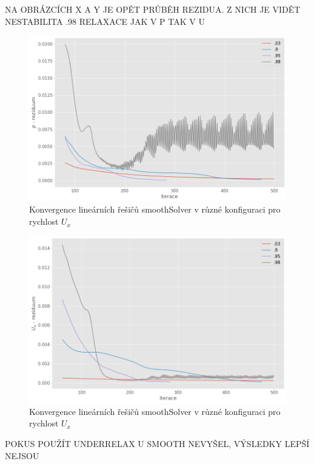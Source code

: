 \documentclass[a4paper,12pt]{report}
\theoremstyle{remark}
\begin{document}
NA OBRÁZCÍCH X A Y JE OPĚT PRŮBĚH REZIDUA. Z NICH JE VIDĚT NESTABILITA .98 RELAXACE JAK V P TAK V U

\begin{figure}[H]
	\centering
	\includegraphics[width=1\linewidth]{p-under-relax.png}
	\caption{Konvergence lineárních řešičů smoothSolver v různé konfiguraci pro rychlost $U_x$}
	\label{fig:p-residuum-relax}
\end{figure}

\begin{figure}[H]
	\centering
	\includegraphics[width=1\linewidth]{ux-under-relax.png}
	\caption{Konvergence lineárních řešičů smoothSolver v různé konfiguraci pro rychlost $U_x$}
	\label{fig:ux-residuum-relax}
\end{figure}

POKUS POUŽÍT UNDERRELAX U SMOOTH NEVYŠEL, VÝSLEDKY LEPŠÍ NEJSOU
\end{document}
